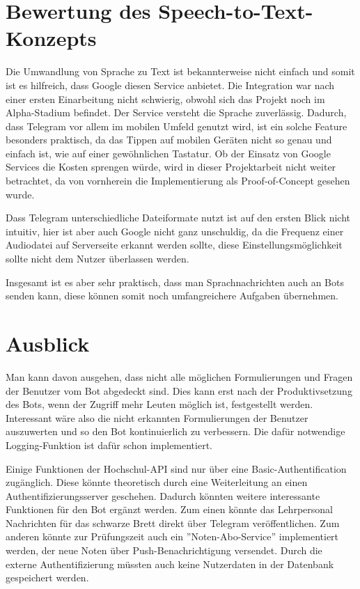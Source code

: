 \section{Bewertung des Speech-to-Text-Konzepts}
Die Umwandlung von Sprache zu Text ist bekannterweise nicht einfach und somit ist es hilfreich, dass Google diesen Service anbietet. Die Integration war nach einer ersten Einarbeitung nicht schwierig, obwohl sich das Projekt noch im Alpha-Stadium befindet. Der Service versteht die Sprache zuverlässig.
Dadurch, dass Telegram vor allem im mobilen Umfeld genutzt wird, ist ein solche Feature besonders praktisch, da das Tippen auf mobilen Geräten nicht so genau und einfach ist, wie auf einer gewöhnlichen Tastatur. Ob der Einsatz von Google Services die Kosten sprengen würde, wird in dieser Projektarbeit nicht weiter betrachtet, da von vornherein die Implementierung als Proof-of-Concept gesehen wurde.

Dass Telegram unterschiedliche Dateiformate nutzt ist auf den ersten Blick nicht intuitiv, hier ist aber auch Google nicht ganz unschuldig, da die Frequenz einer Audiodatei auf Serverseite erkannt werden sollte, diese Einstellungsmöglichkeit sollte nicht dem Nutzer überlassen werden.

Insgesamt ist es aber sehr praktisch, dass man Sprachnachrichten auch an Bots senden kann, diese können somit noch umfangreichere Aufgaben übernehmen.

\section{Ausblick}
Man kann davon ausgehen, dass nicht alle möglichen Formulierungen und Fragen der Benutzer vom Bot abgedeckt sind. Dies kann erst nach der Produktivsetzung des Bots, wenn der Zugriff mehr Leuten möglich ist, festgestellt werden. Interessant wäre also die nicht erkannten Formulierungen der Benutzer auszuwerten und so den Bot kontinuierlich zu verbessern. Die dafür notwendige Logging-Funktion ist dafür schon implementiert.

Einige Funktionen der Hochschul-API sind nur über eine Basic-Authentification zugänglich. Diese könnte theoretisch durch eine Weiterleitung an einen Authentifizierungsserver geschehen. Dadurch könnten weitere interessante Funktionen für den Bot ergänzt werden. Zum einen könnte das Lehrpersonal Nachrichten für das schwarze Brett direkt über Telegram veröffentlichen. Zum anderen könnte zur Prüfungszeit auch ein ''Noten-Abo-Service'' implementiert werden, der neue Noten über Push-Benachrichtigung versendet. Durch die externe Authentifizierung müssten auch keine Nutzerdaten in der Datenbank gespeichert werden.

